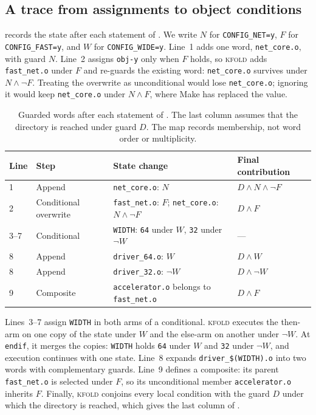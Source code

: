 \documentclass[acmsmall,screen,review]{acmart}
\newcommand{\tool}{\textsc{kfold}\xspace}
\begin{document}
\subsection{A trace from assignments to object conditions}
\label{sec:overview:trace}
 records the state after each statement of . We write $N$ for \texttt{CONFIG\_NET=y}, $F$ for \texttt{CONFIG\_FAST=y}, and $W$ for \texttt{CONFIG\_WIDE=y}. Line~1 adds one word, \texttt{net\_core.o}, with guard $N$. Line~2 assigns \texttt{obj-y} only when $F$ holds, so \tool adds \texttt{fast\_net.o} under $F$ and re-guards the existing word: \texttt{net\_core.o} survives under $N\land\neg F$. Treating the overwrite as unconditional would lose \texttt{net\_core.o}; ignoring it would keep \texttt{net\_core.o} under $N\land F$, where Make has replaced the value.

\begin{table}[t]
\centering\footnotesize
\caption{Guarded words after each statement of . The last column assumes that the directory is reached under guard $D$. The map records membership, not word order or multiplicity.}
\label{tab:example-trace}
\begin{tabular}{llll}
\toprule
Line & Step & State change & Final contribution \\
\midrule
1 & Append & \texttt{net\_core.o}: $N$ & $D\land N\land\neg F$ \\
2 & Conditional overwrite & \texttt{fast\_net.o}: $F$; \texttt{net\_core.o}: $N\land\neg F$ & $D\land F$ \\
3--7 & Conditional & \texttt{WIDTH}: \texttt{64} under $W$, \texttt{32} under $\neg W$ & --- \\
8 & Append & \texttt{driver\_64.o}: $W$ & $D\land W$ \\
8 & Append & \texttt{driver\_32.o}: $\neg W$ & $D\land\neg W$ \\
9 & Composite & \texttt{accelerator.o} belongs to \texttt{fast\_net.o} & $D\land F$ \\
\bottomrule
\end{tabular}
\end{table}

Lines~3--7 assign \texttt{WIDTH} in both arms of a conditional. \tool executes the then-arm on one copy of the state under $W$ and the else-arm on another under $\neg W$. At \texttt{endif}, it merges the copies: \texttt{WIDTH} holds \texttt{64} under $W$ and \texttt{32} under $\neg W$, and execution continues with one state. Line~8 expands \texttt{driver\_\$(WIDTH).o} into two words with complementary guards. Line~9 defines a composite: its parent \texttt{fast\_net.o} is selected under $F$, so its unconditional member \texttt{accelerator.o} inherits $F$. Finally, \tool conjoins every local condition with the guard $D$ under which the directory is reached, which gives the last column of .
\end{document}
